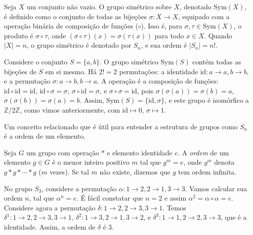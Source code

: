 

\begin{definition}
  Seja $X$ um conjunto não vazio. O grupo simétrico sobre $X$, denotado
  $\text{Sym}(X)$, é definido como o conjunto de todas as bijeções $\sigma: X \to X$,
  equipado com a operação binária de composição de funções ($\circ$).
  Isso é, para $\sigma, \tau \in \text{Sym}(X)$, o produto é $\sigma \circ \tau$,
  onde $(\sigma \circ \tau)(x) = \sigma(\tau(x))$ para todo $x \in X$.
  Quando $|X| = n$, o grupo simétrico é denotado por $S_n$, e sua ordem é
  $|S_n| = n!$.
\end{definition}

\begin{example}
  Considere o conjunto $S = \{a, b\}$. O grupo simétrico $\text{Sym}(S)$ contém
  todas as bijeções de $S$ em si mesmo. Há $2! = 2$ permutações: a identidade
  $\text{id}: a \to a, b \to b$, e a permutação $\sigma: a \to b, b \to a$. A
  operação é a composição de funções: $\text{id} \circ \text{id} = \text{id}$,
  $\text{id} \circ \sigma = \sigma$, $\sigma \circ \text{id} = \sigma$, e
  $\sigma \circ \sigma = \text{id}$, pois $\sigma(\sigma(a)) = \sigma(b) = a$,
  $\sigma(\sigma(b)) = \sigma(a) = b$. Assim,
  $\text{Sym}(S) = \{ \text{id}, \sigma \}$, e este grupo é isomórfico a 
  $\mathbb{Z}/2\mathbb{Z}$, como vimos anteriormente, com
  $\text{id} \mapsto 0$, $\sigma \mapsto 1$.
\end{example}


Um conceito relacionado que é útil para entender a estrutura de grupos como $
S_n$ é a ordem de um elemento.

\begin{definition}
Seja $G$ um grupo com operação $*$ e elemento identidade $e$. A
  \emph{ordem} de um elemento $g \in G$ é o menor inteiro positivo $m$
  tal que $g^m = e$, onde $g^m$ denota $g * g * \cdots * g$ ($m
$ vezes). Se tal $m$ não existe, dizemos que $g$ tem ordem infinita.
\end{definition}

\begin{example}
  No grupo $S_3$, considere a permutação $\alpha: 1 \to 2, 2 \to 1, 3 \to 3$.
  Vamos calcular sua ordem $n$, tal que $\alpha^n = e$. 
  É fácil constatar que $n=2$ e assim $\alpha^2 = \alpha \circ \alpha = e$.
  Considere agora a permutação $\delta: 1 \to 2, 2 \to 3, 3 \to 1$. 
  Temos $\delta^1: 1 \to 2, 2 \to 3, 3 \to 1$, 
  $\delta^2: 1 \to 3, 2 \to 1, 3 \to 2$, e
  $\delta^3: 1 \to 1, 2 \to 2, 3 \to 3$, que é a identidade.
  Assim, a ordem de $\delta$ é 3. 
\end{example}

